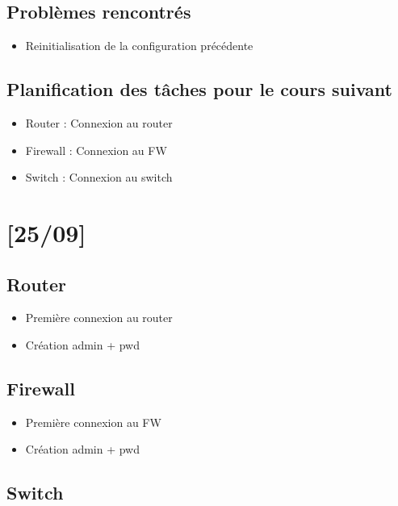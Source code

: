 \documentclass{article}
\begin{document}
\subsection{Problèmes rencontrés}

\begin{itemize}
\item Reinitialisation de la configuration précédente
\end{itemize} 

\subsection{Planification des tâches pour le cours suivant}

\begin{itemize}
\item Router : Connexion au router
\item Firewall : Connexion au FW
\item Switch : Connexion au switch
\end{itemize}

\newpage

\section{[25/09]}

\subsection{Router}

\begin{itemize}

\item Première connexion au router
\item Création admin + pwd
\end{itemize}

\subsection{Firewall}

\begin{itemize}

\item Première connexion au FW
\item Création admin + pwd
\end{itemize}


\subsection{Switch}
\end{document}
